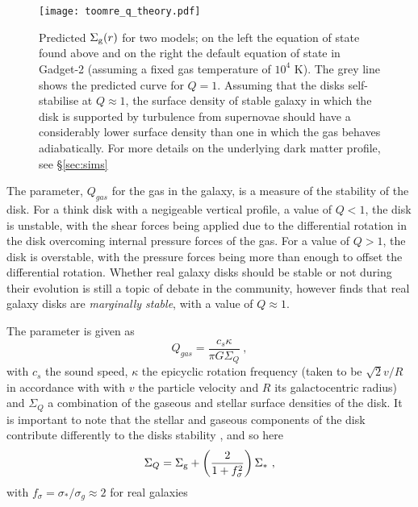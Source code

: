 \begin{figure}[ht]
    \centering
    \texttt{[image: toomre\_q\_theory.pdf]}
    \caption{Predicted $\Sigma_\mathrm{g}(r)$ for two models; on the left the equation of state found above and on the right the default equation of state in Gadget-2 (assuming a fixed gas temperature of $10^4$ K). The grey line shows the predicted curve for $Q=1$. Assuming that the disks self-stabilise at $Q\approx1$, the surface density of stable galaxy in which the disk is supported by turbulence from supernovae should have a considerably lower surface density than one in which the gas behaves adiabatically. For more details on the underlying dark matter profile, see \S \ref{sec:sims}}
    \label{fig:toomreqthr}
\end{figure}

The \citet{toomre_gravitational_1964} parameter, $Q_{gas}$ for the gas in the galaxy, is a measure of the stability of the disk.
For a think disk with a negigeable vertical profile, a value of $Q<1$, the disk is unstable, with the shear forces being applied due to the differential rotation in the disk overcoming internal pressure forces of the gas.
For a value of $Q>1$, the disk is overstable, with the pressure forces being more than enough to offset the differential rotation.
Whether real galaxy disks should be stable or not during their evolution is still a topic of debate in the community, however \citet{hopkins_stellar_2012} finds that real galaxy disks are \emph{marginally stable}, with a value of $Q \approx 1$.

The \citet{toomre_gravitational_1964} parameter is given as
\begin{equation}
    Q_{gas} = \frac{c_s \kappa}{\pi G \Sigma_Q}~,
    \label{eqn:Q}
\end{equation}
with $c_s$ the sound speed, $\kappa$ the epicyclic rotation frequency (taken to be $\sqrt{2} v/R$ in accordance with \citet{livermore_resolved_2015} with $v$ the particle velocity and $R$ its galactocentric radius) and $\Sigma_Q$ a combination of the gaseous and stellar surface densities of the disk.
It is important to note that the stellar and gaseous components of the disk contribute differently to the disks stability \citep{rafikov_local_2001}, and so here
\begin{equation}
    \Sigma_Q = \Sigma_\mathrm{g}  + \left(\frac{2}{1 + f_\sigma^2}\right)\Sigma_*~,
    \label{eqn:sgq}
\end{equation}
with $f_\sigma = \sigma_*/\sigma_g \approx 2$ for real galaxies \citep{korchagin_local_2003}

